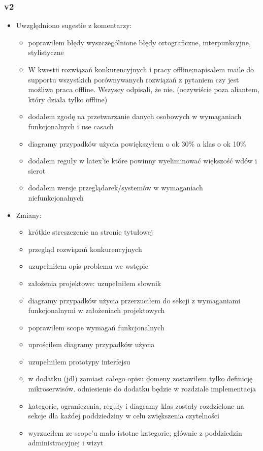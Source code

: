 \subsubsection{v2}
\begin{itemize}
\item Uwzględniono sugestie z komentarzy:
    \begin{itemize}
	\item poprawiłem błędy wyszczególnione błędy ortograficzne, interpunkcyjne, stylistyczne
	\item W kwestii rozwiązań konkurencyjnych i pracy offline;napisałem maile do supportu wszystkich porównywanych rozwiązań z pytaniem czy jest możliwa praca offline. Wszyscy odpisali, że nie. (oczywiście poza aliantem, który działa tylko offline)
	\item dodałem zgodę na przetwarzanie danych osobowych w wymaganiach funkcjonalnych i use casach
	\item diagramy przypadków użycia powiększyłem o ok 30\% a klas o ok 10\%
	\item dodałem reguły w latex'ie które powinny wyeliminować większość wdów i sierot
	\item dodałem wersje przeglądarek/systemów w wymaganiach niefunkcjonalnych
	\end{itemize}
\item Zmiany:
    \begin{itemize}
	\item krótkie streszczenie na stronie tytułowej
	\item przegląd rozwiązań konkurencyjnych
	\item uzupełniłem opis problemu we wstępie
	\item założenia projektowe: uzupełniłem słownik
	\item diagramy przypadków użycia przerzuciłem do sekcji z wymaganiami funkcjonalnymi w założeniach projektowych
	\item poprawiłem scope wymagań funkcjonalnych
	\item uprościłem diagramy przypadków użycia
	\item uzupełniłem prototypy interfejsu
	\item w dodatku (jdl) zamiast całego opisu domeny zostawiłem tylko definicję mikroserwisów. odniesienie do dodatku będzie w rozdziale implementacja
	\item kategorie, ograniczenia, reguły i diagramy klas zostały rozdzielone na sekcje dla każdej poddziedziny w celu zwiększenia czytelności
	\item wyrzuciłem ze scope'u mało istotne kategorie; głównie z poddziedzin administracyjnej i wizyt

\end{itemize}
\end{itemize}
